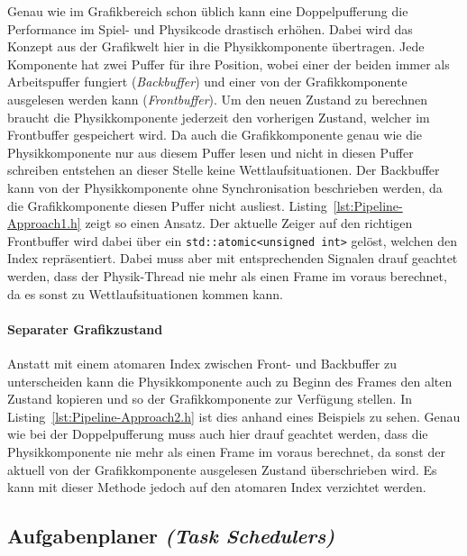 \documentclass[12pt, a4paper, titlepage, hidelinks]{scrreprt}
\begin{document}
Genau wie im Grafikbereich schon üblich kann eine Doppelpufferung die Performance im Spiel- und Physikcode drastisch erhöhen. Dabei wird das Konzept aus der Grafikwelt hier in die Physikkomponente übertragen. Jede Komponente hat zwei Puffer für ihre Position, wobei einer der beiden immer als Arbeitspuffer fungiert (\textit{Backbuffer}) und einer von der Grafikkomponente ausgelesen werden kann (\textit{Frontbuffer}). Um den neuen Zustand zu berechnen braucht die Physikkomponente jederzeit den vorherigen Zustand, welcher im Frontbuffer gespeichert wird. Da auch die Grafikkomponente genau wie die Physikkomponente nur aus diesem Puffer lesen und nicht in diesen Puffer schreiben entstehen an dieser Stelle keine Wettlaufsituationen. Der Backbuffer kann von der Physikkomponente ohne Synchronisation beschrieben werden, da die Grafikkomponente diesen Puffer nicht ausliest. Listing~\autoref{lst:Pipeline-Approach1.h} zeigt so einen Ansatz. Der aktuelle Zeiger auf den richtigen Frontbuffer wird dabei über ein \texttt{std::atomic<unsigned int>} gelöst, welchen den Index repräsentiert. Dabei muss aber mit entsprechenden Signalen drauf geachtet werden, dass der Physik-Thread nie mehr als einen Frame im voraus berechnet, da es sonst zu Wettlaufsituationen kommen kann.


\clearpage

\paragraph{Separater Grafikzustand}

Anstatt mit einem atomaren Index zwischen Front- und Backbuffer zu unterscheiden kann die Physikkomponente auch zu Beginn des Frames den alten Zustand kopieren und so der Grafikkomponente zur Verfügung stellen. In Listing~\autoref{lst:Pipeline-Approach2.h} ist dies anhand eines Beispiels zu sehen. Genau wie bei der Doppelpufferung muss auch hier drauf geachtet werden, dass die Physikkomponente nie mehr als einen Frame im voraus berechnet, da sonst der aktuell von der Grafikkomponente ausgelesen Zustand überschrieben wird. Es kann mit dieser Methode jedoch auf den atomaren Index verzichtet werden.


\clearpage

\subsection{Aufgabenplaner \textit{(Task Schedulers)}}
\end{document}
